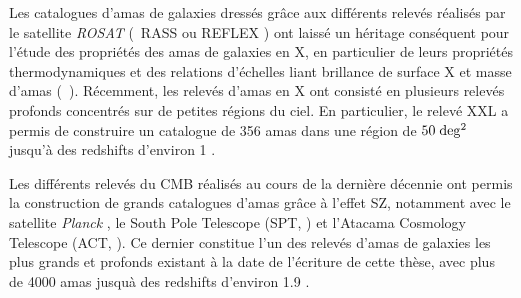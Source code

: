 Les catalogues d'amas de galaxies dressés grâce aux différents relevés réalisés par le satellite \textit{ROSAT} (\eg\ RASS \cite{bohringer_northern_2000} ou REFLEX \cite{bohringer_rosat-eso_2004}) ont laissé un héritage conséquent pour l'étude des propriétés des amas de galaxies en X, en particulier de leurs propriétés thermodynamiques et des relations d'échelles liant brillance de surface X et masse d'amas (\eg\ \cite{arnaud_universal_2010, pratt_galaxy_2009,pratt_gas_2010}).
Récemment, les relevés d'amas en X ont consisté en plusieurs relevés profonds concentrés sur de petites régions du ciel.
En particulier, le relevé XXL a permis de construire un catalogue de 356 amas dans une région de $50 \;{\rm deg^2}$ jusqu'à des redshifts d'environ 1 \cite{adami_xxl_2018}.

Les différents relevés du CMB réalisés au cours de la dernière décennie ont permis la construction de grands catalogues d'amas grâce à l'effet SZ, notamment avec le satellite \textit{Planck} \cite{planck_collaboration_planck_2016-2}, le South Pole Telescope (SPT, \cite{bleem_sptpol_2020}) et l'Atacama Cosmology Telescope (ACT, \cite{hilton_atacama_2021}).
Ce dernier constitue l'un des relevés d'amas de galaxies les plus grands et profonds existant à la date de l'écriture de cette thèse, avec plus de 4000 amas jusquà des redshifts d'environ 1.9 \cite{hilton_atacama_2021}.

